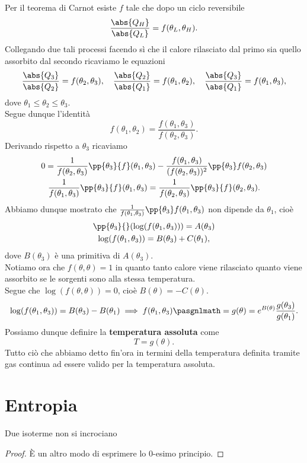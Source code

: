 \noindent
Per il teorema di Carnot esiste $f$ tale che dopo un ciclo reversibile
\[\frac{\abs{Q_H}}{\abs{Q_L}}=f(\theta_L,\theta_H).\]
Collegando due tali processi facendo s\`i che il calore rilasciato dal primo sia quello assorbito dal secondo ricaviamo le equazioni
\[\frac{\abs{Q_3}}{\abs{Q_2}}=f(\theta_2,\theta_3),\quad\frac{\abs{Q_2}}{\abs{Q_1}}=f(\theta_1,\theta_2),\quad \frac{\abs{Q_3}}{\abs{Q_1}}=f(\theta_1,\theta_3),\]
dove $\theta_1\leq \theta_2\leq \theta_3$.\\
Segue dunque l'identit\`a
\[f(\theta_1,\theta_2)=\frac{f(\theta_1,\theta_3)}{f(\theta_2,\theta_3)}.\]
Derivando rispetto a $\theta_3$ ricaviamo
\begin{gather*}
0=\frac1{f(\theta_2,\theta_3)}\pp{\theta_3}{f}(\theta_1,\theta_3)-\frac{f(\theta_1,\theta_3)}{(f(\theta_2,\theta_3))^2}\pp{\theta_3}f(\theta_2,\theta_3)\\
\frac1{f(\theta_1,\theta_3)}\pp{\theta_3}{f}(\theta_1,\theta_3)=\frac1{f(\theta_2,\theta_3)}\pp{\theta_3}{f}(\theta_2,\theta_3).
\end{gather*}
Abbiamo dunque mostrato che $\frac1{f(\theta_1,\theta_3)}\pp{\theta_3}f(\theta_1,\theta_3)$ non dipende da $\theta_1$, cio\`e
\begin{gather*}
\pp{\theta_3}{}(\log(f(\theta_1,\theta_3)))=A(\theta_3)\\
\log(f(\theta_1,\theta_3))=B(\theta_3)+C(\theta_1),
\end{gather*}
dove $B(\theta_3)$ \`e una primitiva di $A(\theta_3)$.\\
Notiamo ora che $f(\theta,\theta)=1$ in quanto tanto calore viene rilasciato quanto viene assorbito se le sorgenti sono alla stessa temperatura.\\ 
Segue che $\log(f(\theta,\theta))=0$, cio\`e $B(\theta)=-C(\theta)$.
\[\log(f(\theta_1,\theta_3))=B(\theta_3)-B(\theta_1)\implies f(\theta_1,\theta_3)\pasgnlmath={g(\theta)=e^{B(\theta)}}\frac{g(\theta_3)}{g(\theta_1)}.\]
Possiamo dunque definire la \textbf{temperatura assoluta} come
\[T=g(\theta).\]
Tutto ci\`o che abbiamo detto fin'ora in termini della temperatura definita tramite gas continua ad essere valido per la temperatura assoluta.

\section{Entropia}

\begin{lemma}\label{IsotermeFibrano}
Due isoterme non si incrociano
\end{lemma}
\begin{proof}
\`E un altro modo di esprimere lo 0-esimo principio.
\end{proof}

